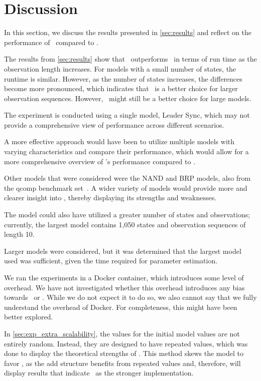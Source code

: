 \section{Discussion}\label{sec:discussion}
In this section, we discuss the results presented in \autoref{sec:results} and reflect on the performance of \Cupaal\ compared to \Jajapy.

The results from \autoref{sec:results} show that \Cupaal\ outperforms \Jajapy\ in terms of run time as the observation length increases.
For models with a small number of states, the runtime is similar.
However, as the number of states increases, the differences become more pronounced, which indicates that \Cupaal\ is a better choice for larger observation sequences. However, \Jajapy\ might still be a better choice for large models.

The experiment is conducted using a single model, Leader Sync, which may not provide a comprehensive view of performance across different scenarios.

A more effective approach would have been to utilize multiple models with varying characteristics and compare their performance, which would allow for a more comprehensive overview of \Cupaal's performance compared to \Jajapy.

Other models that were considered were the NAND and BRP models, also from the qcomp benchmark set~\cite{hartmanns2019quantitative}.
A wider variety of models would provide more and clearer insight into \Cupaal, thereby displaying its strengths and weaknesses.

The model could also have utilized a greater number of states and observations; currently, the largest model contains 1,050 states and observation sequences of length 10.

Larger models were considered, but it was determined that the largest model used was sufficient, given the time required for parameter estimation.

We ran the experiments in a Docker container, which introduces some level of overhead.
We have not investigated whether this overhead introduces any bias towards \Jajapy\ or \Cupaal.
While we do not expect it to do so, we also cannot say that we fully understand the overhead of Docker.
For completeness, this might have been better explored.

In \autoref{sec:exp_extra_scalability}, the values for the initial model values are not entirely random. Instead, they are designed to have repeated values, which was done to display the theoretical strengths of \Cupaal.
This method skews the model to favor \Cupaal, as the \gls{add} structure benefits from repeated values and, therefore, will display results that indicate \Cupaal\ as the stronger implementation.

